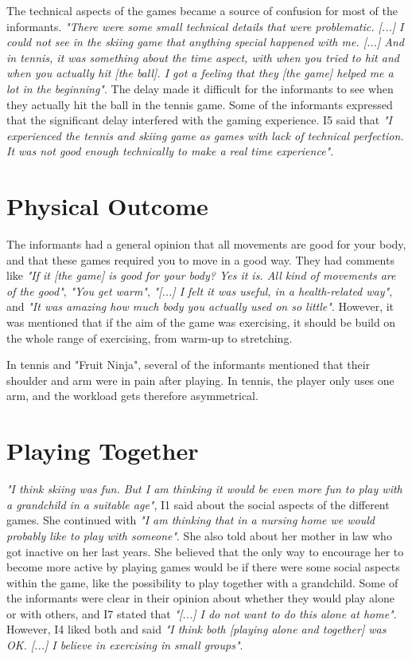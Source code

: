 The technical aspects of the games became a source of confusion for most of the informants. \emph{"There were some small technical details that were problematic. [...] I could not see in the skiing game that anything special happened with me. [...] And in tennis, it was something about the time aspect, with when you tried to hit and when you actually hit [the ball]. I got a feeling that they [the game] helped me a lot in the beginning"}. The delay made it difficult for the informants to see when they actually hit the ball in the tennis game. Some of the informants expressed that the significant delay interfered with the gaming experience. I5 said that \emph{"I experienced the tennis and skiing game as games with lack of technical perfection. It was not good enough technically to make a real time experience"}. 

\section{Physical Outcome}

The informants had a general opinion that all movements are good for your body, and that these games required you to move in a good way. They had comments like \emph{"If it [the game] is good for your body? Yes it is. All kind of movements are of the good"}, \emph{"You get warm"}, \emph{"[...] I felt it was useful, in a health-related way"}, and \emph{"It was amazing how much body you actually used on so little"}. However, it was mentioned that if the aim of the game was exercising, it should be build on the whole range of exercising, from warm-up to stretching. 

In tennis and "Fruit Ninja", several of the informants mentioned that their shoulder and arm were in pain after playing. In tennis, the player only uses one arm, and the workload gets therefore asymmetrical.  
    
\section{Playing Together}
\emph{"I think skiing was fun. But I am thinking it would be even more fun to play with a grandchild in a suitable age"}, I1 said about the social aspects of the different games. She continued with \emph{"I am thinking that in a nursing home we would probably like to play with someone"}. She also told about her mother in law who got inactive on her last years. She believed that the only way to encourage her to become more active by playing games would be if there were some social aspects within the game, like the possibility to play together with a grandchild. Some of the informants were clear in their opinion about whether they would play alone or with others, and I7 stated that \emph{"[...] I do not want to do this alone at home"}. However, I4 liked both and said \emph{"I think both [playing alone and together] was OK. [...] I believe in  exercising in small groups"}.

